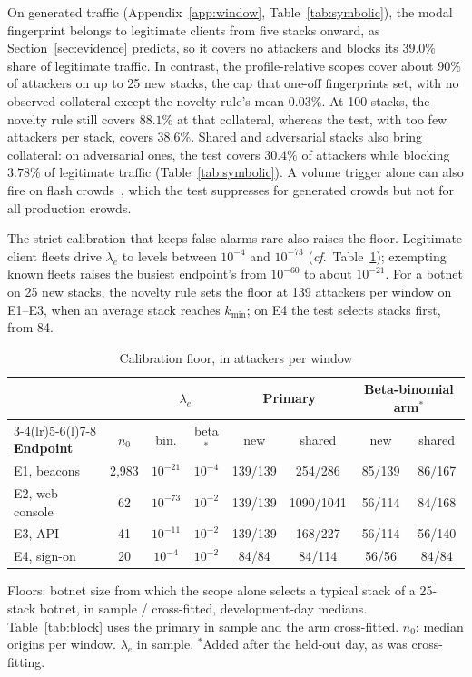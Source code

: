 \documentclass[conference,letterpaper,10pt]{IEEEtran}
\newcommand{\cf}{\textit{c}\textit{f}.\ }
\newcommand\1{\textit{(i)}}
\newcommand\2{\textit{(ii)}}
\newcommand\3{\textit{(iii)}}
\newcommand\4{\textit{(iv)}}
\newcommand\5{\textit{(v)}}
\newcommand\6{\textit{(vi)}}
\newcommand\7{\textit{(vii)}}
\newcommand\8{\textit{(viii)}}
\newcommand\9{\textit{(ix)}}
\begin{document}
On generated traffic (Appendix~\ref{app:window}, Table~\ref{tab:symbolic}), the modal fingerprint belongs to legitimate clients from five stacks onward, as Section~\ref{sec:evidence} predicts, so it covers no attackers and blocks its $39.0\%$ share of legitimate traffic. In contrast, the profile-relative scopes cover about $90\%$ of attackers on up to 25 new stacks, the cap that one-off fingerprints set, with no observed collateral except the novelty rule's mean $0.03\%$. At 100 stacks, the novelty rule still covers $88.1\%$ at that collateral, whereas the test, with too few attackers per stack, covers $38.6\%$. Shared and adversarial stacks also bring collateral: on adversarial ones, the test covers $30.4\%$ of attackers while blocking $3.78\%$ of legitimate traffic (Table~\ref{tab:symbolic}). A volume trigger alone can also fire on flash crowds~\cite{jung2002flash}, which the test suppresses for generated crowds but not for all production crowds.

The strict calibration that keeps false alarms rare also raises the floor. Legitimate client fleets drive $\lambda_e$ to levels between $10^{-4}$ and $10^{-73}$ (\cf Table~\ref{tab:floor}); exempting known fleets raises the busiest endpoint's from $10^{-60}$ to about $10^{-21}$. For a botnet on 25 new stacks, the novelty rule sets the floor at 139 attackers per window on E1--E3, when an average stack reaches $k_{\min}$; on E4 the test selects stacks first, from 84.

\begin{table}[!h]
\centering
\caption{Calibration floor, in attackers per window}
\label{tab:floor}
\scriptsize
\setlength{\tabcolsep}{2.2pt}
\begin{tabular}{@{}lccccccc@{}}
\toprule
 & & \multicolumn{2}{c}{$\lambda_e$} & \multicolumn{2}{c}{\textbf{Primary}} & \multicolumn{2}{c}{\textbf{Beta-binomial arm}$^{*}$} \\
\cmidrule(lr){3-4}\cmidrule(lr){5-6}\cmidrule(l){7-8}
\textbf{Endpoint} & $n_0$ & bin. & beta$^{*}$ & new & shared & new & shared \\
\midrule
E1, beacons     & 2,983  & $10^{-21}$ & $10^{-4}$ & 139/139 & 254/286 & 85/139 & 86/167 \\
E2, web console & 62      & $10^{-73}$ & $10^{-2}$ & 139/139 & 1090/1041 & 56/114 & 84/168 \\
E3, API         & 41      & $10^{-11}$ & $10^{-2}$ & 139/139 & 168/227 & 56/114 & 56/140 \\
E4, sign-on     & 20      & $10^{-4}$ & $10^{-2}$ & 84/84 & 84/114 & 56/56 & 84/84 \\
\bottomrule
\end{tabular}

\vspace{2pt}
\begin{minipage}{\linewidth}\footnotesize Floors: botnet size from which the scope alone selects a typical stack of a 25-stack botnet, in sample / cross-fitted, development-day medians. Table~\ref{tab:block} uses the primary in sample and the arm cross-fitted. $n_0$: median origins per window. $\lambda_e$ in sample. $^{*}$Added after the held-out day, as was cross-fitting.\end{minipage}
\end{table}
\end{document}
